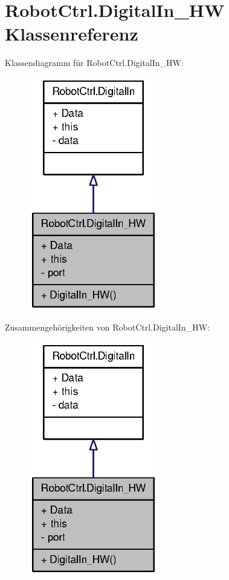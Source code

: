 \hypertarget{class_robot_ctrl_1_1_digital_in___h_w}{
\section{RobotCtrl.DigitalIn\_\-HW Klassenreferenz}
\label{class_robot_ctrl_1_1_digital_in___h_w}
}


Klassendiagramm für RobotCtrl.DigitalIn\_\-HW:\nopagebreak
\begin{figure}[H]
\begin{center}
\leavevmode
\includegraphics[width=160pt]{class_robot_ctrl_1_1_digital_in___h_w__inherit__graph}
\end{center}
\end{figure}


Zusammengehörigkeiten von RobotCtrl.DigitalIn\_\-HW:\nopagebreak
\begin{figure}[H]
\begin{center}
\leavevmode
\includegraphics[width=160pt]{class_robot_ctrl_1_1_digital_in___h_w__coll__graph}
\end{center}
\end{figure}
